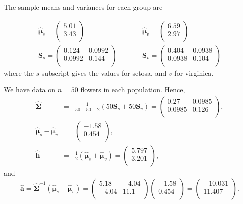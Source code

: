 \documentclass[
]{book}
\theoremstyle{definition}
\theoremstyle{definition}
\theoremstyle{definition}
\theoremstyle{definition}
\theoremstyle{remark}
\begin{document}
The sample means and variances for each group are

\begin{eqnarray*}
\hat{{\boldsymbol{\mu}}}_s = \begin{pmatrix}5.01 \\3.43 \\\end{pmatrix} &\qquad& \hat{{\boldsymbol{\mu}}}_v = \begin{pmatrix}6.59 \\2.97 \\\end{pmatrix} \\
\mathbf S_s = \begin{pmatrix}0.124&0.0992 \\0.0992&0.144 \\\end{pmatrix} &\qquad& \mathbf S_v =\begin{pmatrix}0.404&0.0938 \\0.0938&0.104 \\\end{pmatrix}
\end{eqnarray*}
where the \(s\) subscript gives the values for setosa, and \(v\) for virginica.

We have data on \(n=50\) flowers in each population. Hence,
\begin{eqnarray*}
\widehat{\boldsymbol{\Sigma}} &=& \frac{1}{50+50-2} \left(50 \mathbf S_s + 50 \mathbf S_v \right)= \begin{pmatrix}0.27&0.0985 \\0.0985&0.126 \\\end{pmatrix}, \\
\hat{{\boldsymbol{\mu}}}_s - \hat{{\boldsymbol{\mu}}}_v &=& \begin{pmatrix}-1.58 \\0.454 \\\end{pmatrix}, \\
\hat{\mathbf h} &=& \frac{1}{2} (\hat{{\boldsymbol{\mu}}}_s + \hat{{\boldsymbol{\mu}}}_v) = \begin{pmatrix}5.797 \\3.201 \\\end{pmatrix},
\end{eqnarray*}
and
\[\hat{\mathbf a} = \widehat{\boldsymbol{\Sigma}}^{-1} (\hat{{\boldsymbol{\mu}}}_s - \hat{{\boldsymbol{\mu}}}_v) = \begin{pmatrix}5.18&-4.04 \\-4.04&11.1 \\\end{pmatrix} \begin{pmatrix}-1.58 \\0.454 \\\end{pmatrix} = \begin{pmatrix}-10.031 \\11.407 \\\end{pmatrix}.\]
\end{document}
